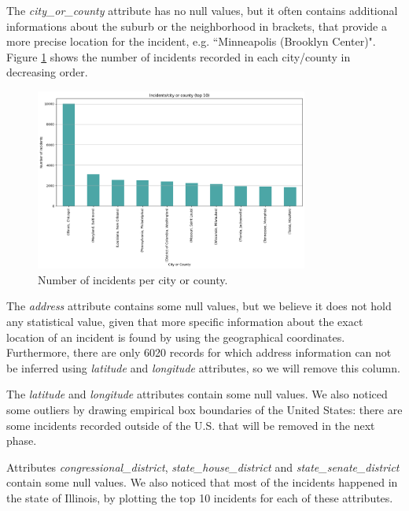 \documentclass[10pt,a4paper]{report}
\begin{document}
The \textit{city\_or\_county} attribute has no null values, but it often contains additional informations about the suburb or the neighborhood in brackets, that provide a more precise location for the incident, e.g. ``Minneapolis (Brooklyn Center)".
Figure \ref{incidents_per_citycounty} shows the number of incidents recorded in each city/county in decreasing order.
\begin{figure}[H]
	\includegraphics[width=0.8\textwidth]{incidents_per_citycounty}
	\centering
	\caption{Number of incidents per city or county.}
	\label{incidents_per_citycounty}
\end{figure}

The \textit{address} attribute contains some null values, but we believe it does not hold any statistical value, given that more specific information about the exact location of an incident is found by using the geographical coordinates.
Furthermore, there are only 6020 records for which address information can not be inferred using \textit{latitude} and \textit{longitude} attributes, so we will remove this column.

The \textit{latitude} and \textit{longitude} attributes contain some null values.
We also noticed some outliers by drawing empirical box boundaries of the United States: there are some incidents recorded outside of the U.S. that will be removed in the next phase.

Attributes \textit{congressional\_district}, \textit{state\_house\_district} and \textit{state\_senate\_district} contain some null values.
We also noticed that most of the incidents happened in the state of Illinois, by plotting the top 10 incidents for each of these attributes.
\end{document}

